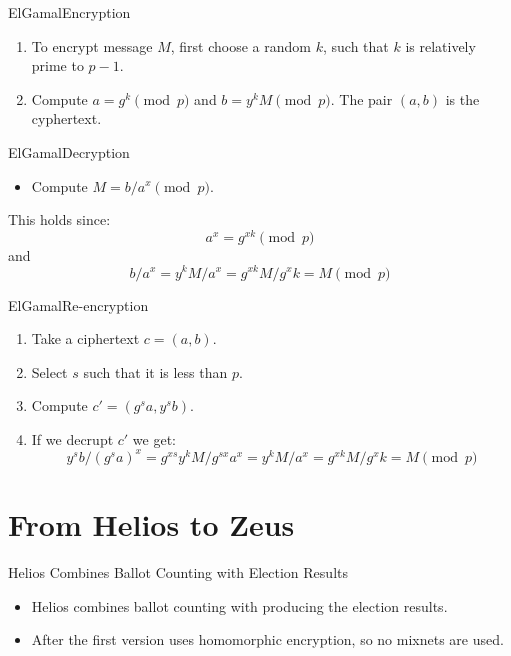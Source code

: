 \documentclass[utf8]{beamer}
\begin{document}
\begin{frame}{ElGamal}{Encryption}

  \begin{enumerate}
    \item To encrypt message $M$, first choose a random $k$, such that
      $k$ is relatively prime to $p - 1$.
    \item Compute $a = g^k\pmod{p}$ and $b = y^kM\pmod{p}$. The pair
      $(a, b)$ is the cyphertext.
    \end{enumerate}
  \end{frame}

\begin{frame}{ElGamal}{Decryption}

  \begin{itemize}
  \item Compute $M = b / a^x\pmod{p}$.
  \end{itemize}
  
  This holds since:
  \[ a^x = g^{xk}\pmod{p} \]
  and 
  \[ b/a^x = y^kM/a^x = g^{xk}M/g^xk = M\pmod{p} \]

\end{frame}

\begin{frame}{ElGamal}{Re-encryption}

  \begin{enumerate}
  \item Take a ciphertext $c = (a, b)$.
  \item Select $s$ such that it is less than $p$.
  \item Compute $c' = (g^sa, y^sb)$.
  \item If we decrupt $c'$ we get:
    \[y^sb / (g^sa)^x = g^{xs}y^kM / g^{sx}a^x = y^kM / a^x = g^{xk}M/g^xk =
    M\pmod{p} \]
  \end{enumerate}
    
\end{frame}

\section{From Helios to Zeus}

\begin{frame}{Helios Combines Ballot Counting with Election Results}

  \begin{itemize}
  \item Helios combines ballot counting with producing the election
    results.
  \item After the first version uses homomorphic encryption, so no
    mixnets are used.
  \end{itemize}

\end{frame}
\end{document}
